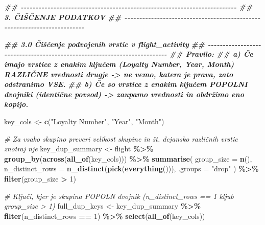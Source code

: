 \documentclass[
]{article}
\newenvironment{Shaded}{\begin{snugshade}}{\end{snugshade}}
\newcommand{\AttributeTok}[1]{\textcolor[rgb]{0.13,0.29,0.53}{#1}}
\newcommand{\CommentTok}[1]{\textcolor[rgb]{0.56,0.35,0.01}{\textit{#1}}}
\newcommand{\DecValTok}[1]{\textcolor[rgb]{0.00,0.00,0.81}{#1}}
\newcommand{\DocumentationTok}[1]{\textcolor[rgb]{0.56,0.35,0.01}{\textbf{\textit{#1}}}}
\newcommand{\FunctionTok}[1]{\textcolor[rgb]{0.13,0.29,0.53}{\textbf{#1}}}
\newcommand{\NormalTok}[1]{#1}
\newcommand{\OtherTok}[1]{\textcolor[rgb]{0.56,0.35,0.01}{#1}}
\newcommand{\SpecialCharTok}[1]{\textcolor[rgb]{0.81,0.36,0.00}{\textbf{#1}}}
\newcommand{\StringTok}[1]{\textcolor[rgb]{0.31,0.60,0.02}{#1}}
\begin{document}
\begin{Shaded}
\begin{Highlighting}[]
\DocumentationTok{\#\# {-}{-}{-}{-}{-}{-}{-}{-}{-}{-}{-}{-}{-}{-}{-}{-}{-}{-}{-}{-}{-}{-}{-}{-}{-}{-}{-}{-}{-}{-}{-}{-}{-}{-}{-}{-}{-}{-}{-}{-}{-}{-}{-}{-}{-}{-}{-}{-}{-}{-}{-}{-}{-}{-}{-}{-}{-}{-}{-}{-}{-}{-}{-}{-}{-}{-}{-}{-}{-}{-}{-}{-}{-}}
\DocumentationTok{\#\# 3. ČIŠČENJE PODATKOV}
\DocumentationTok{\#\# {-}{-}{-}{-}{-}{-}{-}{-}{-}{-}{-}{-}{-}{-}{-}{-}{-}{-}{-}{-}{-}{-}{-}{-}{-}{-}{-}{-}{-}{-}{-}{-}{-}{-}{-}{-}{-}{-}{-}{-}{-}{-}{-}{-}{-}{-}{-}{-}{-}{-}{-}{-}{-}{-}{-}{-}{-}{-}{-}{-}{-}{-}{-}{-}{-}{-}{-}{-}{-}{-}{-}{-}{-}}

\DocumentationTok{\#\# 3.0 Čiščenje podvojenih vrstic v flight\_activity}
\DocumentationTok{\#\# {-}{-}{-}{-}{-}{-}{-}{-}{-}{-}{-}{-}{-}{-}{-}{-}{-}{-}{-}{-}{-}{-}{-}{-}{-}{-}{-}{-}{-}{-}{-}{-}{-}{-}{-}{-}{-}{-}{-}{-}{-}{-}{-}{-}{-}{-}{-}{-}{-}{-}{-}{-}{-}{-}{-}{-}{-}{-}{-}{-}{-}{-}{-}{-}{-}{-}{-}{-}{-}{-}{-}{-}{-}}
\DocumentationTok{\#\# Pravilo:}
\DocumentationTok{\#\#   a) Če imajo vrstice z enakim ključem (Loyalty Number, Year, Month) RAZLIČNE vrednosti drugje {-}\textgreater{} ne vemo, katera je prava, zato odstranimo VSE.}
\DocumentationTok{\#\#   b) Če so vrstice z enakim ključem POPOLNI dvojniki (identične povsod) {-}\textgreater{} zaupamo vrednosti in obdržimo eno kopijo.}

\NormalTok{key\_cols }\OtherTok{\textless{}{-}} \FunctionTok{c}\NormalTok{(}\StringTok{"Loyalty Number"}\NormalTok{, }\StringTok{"Year"}\NormalTok{, }\StringTok{"Month"}\NormalTok{)}

\CommentTok{\# Za vsako skupino preveri velikost skupine in št. dejansko različnih vrstic znotraj nje}
\NormalTok{key\_dup\_summary }\OtherTok{\textless{}{-}}\NormalTok{ flight }\SpecialCharTok{\%\textgreater{}\%}
  \FunctionTok{group\_by}\NormalTok{(}\FunctionTok{across}\NormalTok{(}\FunctionTok{all\_of}\NormalTok{(key\_cols))) }\SpecialCharTok{\%\textgreater{}\%}
  \FunctionTok{summarise}\NormalTok{(}
    \AttributeTok{group\_size        =} \FunctionTok{n}\NormalTok{(),}
    \AttributeTok{n\_distinct\_rows    =} \FunctionTok{n\_distinct}\NormalTok{(}\FunctionTok{pick}\NormalTok{(}\FunctionTok{everything}\NormalTok{())),}
    \AttributeTok{.groups =} \StringTok{"drop"}
\NormalTok{  ) }\SpecialCharTok{\%\textgreater{}\%}
  \FunctionTok{filter}\NormalTok{(group\_size }\SpecialCharTok{\textgreater{}} \DecValTok{1}\NormalTok{)}

\CommentTok{\# Ključi, kjer je skupina POPOLN dvojnik (n\_distinct\_rows == 1 kljub group\_size \textgreater{} 1)}
\NormalTok{full\_dup\_keys }\OtherTok{\textless{}{-}}\NormalTok{ key\_dup\_summary }\SpecialCharTok{\%\textgreater{}\%}
  \FunctionTok{filter}\NormalTok{(n\_distinct\_rows }\SpecialCharTok{==} \DecValTok{1}\NormalTok{) }\SpecialCharTok{\%\textgreater{}\%}
  \FunctionTok{select}\NormalTok{(}\FunctionTok{all\_of}\NormalTok{(key\_cols))}


\end{Highlighting}
\end{Shaded}
\end{document}
